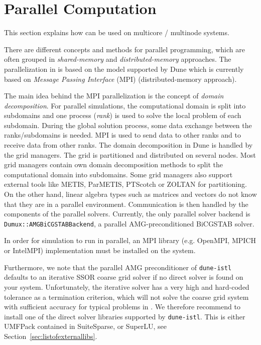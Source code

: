 \section{Parallel Computation}
\label{sec:parallelcomputation}
This section explains how \Dumux can be used
on multicore / multinode systems.

There are different concepts and methods for parallel programming, which are
often grouped in \textit{shared-memory} and \textit{distributed-memory}
approaches. The parallelization in \Dumux is based on the model supported by Dune which is currently based on
\textit{Message Passing Interface} (MPI) (distributed-memory approach).

The main idea behind the MPI parallelization is the concept of \textit{domain
decomposition}. For parallel simulations, the computational domain is split into
subdomains and one process (\textit{rank}) is used to solve the local problem of each
subdomain. During the global solution process, some data exchange between the
ranks/subdomains is needed. MPI is used to send data to other ranks and to receive
data from other ranks. The domain decomposition in Dune is handled by the grid managers.
The grid is partitioned and distributed on several nodes. Most grid managers contain own domain decomposition methods to split the
computational domain  into subdomains. Some grid managers also support external
tools like METIS, ParMETIS, PTScotch or ZOLTAN for partitioning.
On the other hand, linear algebra types such as matrices and vectors
do not know that they are in a parallel environment. Communication is then handled by the components of the
parallel solvers. Currently, the only parallel solver backend is \texttt{Dumux::AMGBiCGSTABBackend}, a parallel AMG-preconditioned
BiCGSTAB solver.

In order for \Dumux simulation to run in parallel, an
MPI library (e.g. OpenMPI, MPICH or IntelMPI) implementation
must be installed on the system.

Furthermore, we note that the parallel AMG preconditioner of \texttt{dune-istl}
defaults to an iterative SSOR coarse grid solver if no direct solver is found on your system. Unfortunately,
the iterative solver has a very high and hard-coded tolerance as a termination criterion, which will not solve
the coarse grid system with sufficient accuracy for typical problems in \Dumux. We therefore recommend
to install one of the direct solver libraries supported by \texttt{dune-istl}. This is either UMFPack contained
in SuiteSparse, or SuperLU, see Section~\ref{sec:listofexternallibs}.

